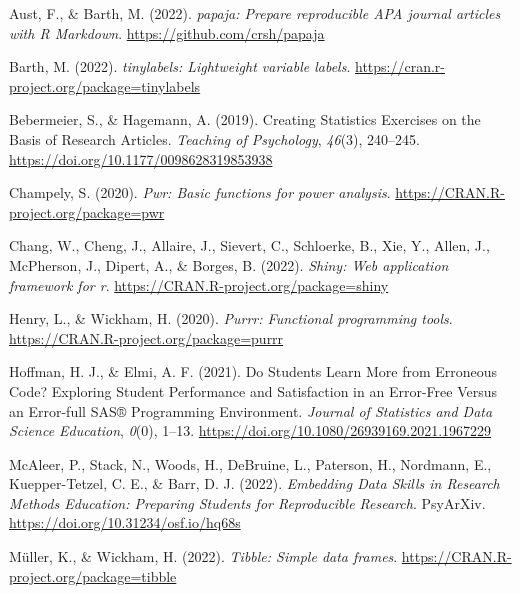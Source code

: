 \documentclass[
  man,floatsintext]{apa6}
\newlength{\cslhangindent}
\newlength{\cslentryspacingunit} %
\newenvironment{CSLReferences}[2] %
 {%
  \setlength{\parindent}{0pt}
  \ifodd #1
  \let\oldpar\par
  \def\par{\hangindent=\cslhangindent\oldpar}
  \fi
  \setlength{\parskip}{#2\cslentryspacingunit}
 }%
 {}
\begin{document}
\hypertarget{refs}{}
\begin{CSLReferences}{1}{0}
\leavevmode{}%
Aust, F., \& Barth, M. (2022). \emph{{papaja}: {Prepare} reproducible {APA} journal articles with {R Markdown}}. \url{https://github.com/crsh/papaja}

\leavevmode{}%
Barth, M. (2022). \emph{{tinylabels}: Lightweight variable labels}. \url{https://cran.r-project.org/package=tinylabels}

\leavevmode{}%
Bebermeier, S., \& Hagemann, A. (2019). Creating {Statistics} {Exercises} on the {Basis} of {Research} {Articles}. \emph{Teaching of Psychology}, \emph{46}(3), 240--245. \url{https://doi.org/10.1177/0098628319853938}

\leavevmode{}%
Champely, S. (2020). \emph{Pwr: Basic functions for power analysis}. \url{https://CRAN.R-project.org/package=pwr}

\leavevmode{}%
Chang, W., Cheng, J., Allaire, J., Sievert, C., Schloerke, B., Xie, Y., Allen, J., McPherson, J., Dipert, A., \& Borges, B. (2022). \emph{Shiny: Web application framework for r}. \url{https://CRAN.R-project.org/package=shiny}

\leavevmode{}%
Henry, L., \& Wickham, H. (2020). \emph{Purrr: Functional programming tools}. \url{https://CRAN.R-project.org/package=purrr}

\leavevmode{}%
Hoffman, H. J., \& Elmi, A. F. (2021). Do {Students} {Learn} {More} from {Erroneous} {Code}? {Exploring} {Student} {Performance} and {Satisfaction} in an {Error}-{Free} {Versus} an {Error}-full {SAS}® {Programming} {Environment}. \emph{Journal of Statistics and Data Science Education}, \emph{0}(0), 1--13. \url{https://doi.org/10.1080/26939169.2021.1967229}

\leavevmode{}%
McAleer, P., Stack, N., Woods, H., DeBruine, L., Paterson, H., Nordmann, E., Kuepper-Tetzel, C. E., \& Barr, D. J. (2022). \emph{Embedding {Data} {Skills} in {Research} {Methods} {Education}: {Preparing} {Students} for {Reproducible} {Research}}. PsyArXiv. \url{https://doi.org/10.31234/osf.io/hq68s}

\leavevmode{}%
Müller, K., \& Wickham, H. (2022). \emph{Tibble: Simple data frames}. \url{https://CRAN.R-project.org/package=tibble}


\end{CSLReferences}
\end{document}
